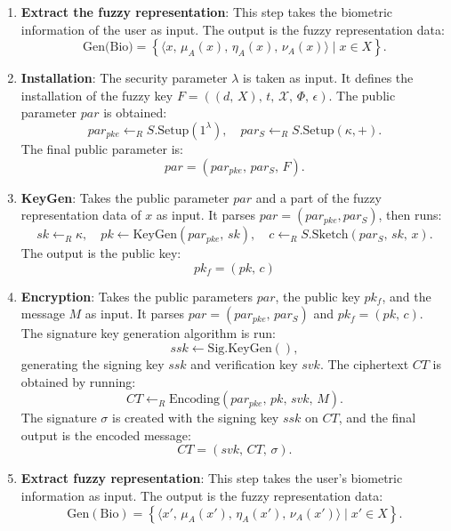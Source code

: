 \documentclass[graybox]{svmult}
\begin{document}
\begin{enumerate}
    \item \textbf{Extract the fuzzy representation}: This step takes the biometric information of the user as input. The output is the fuzzy representation data:
          \[
              \text{Gen(Bio)} = \left\{ \langle x,\, \mu_A(x),\, \eta_A(x),\, \nu_A(x) \rangle \mid x \in X \right\}.
          \]

    \item \textbf{Installation}: The security parameter \( \lambda \) is taken as input. It defines the \break installation of the fuzzy key \( F = ((d,\, X),\, t,\, \mathcal{X},\, \varPhi,\, \epsilon) \). The public parameter \(  par \) is obtained:
          \[
              par_{pke} \leftarrow_R S.\text{Setup}(1^\lambda), \quad par_S \leftarrow_R S.\text{Setup}(\kappa, +).
          \]
          The final public parameter is:
          \[
              par  = (par_{pke},\, par_S,\, F).
          \]

    \item \textbf{KeyGen}: Takes the public parameter \(  par \) and a part of the fuzzy representation data of \( x \) as input. It parses \( par  = (par_{pke}, par_S) \), then runs:
          \[
              sk \leftarrow_R \kappa, \quad pk \leftarrow \text{KeyGen}(par_{pke}, \, sk), \quad c \leftarrow_R S.\text{Sketch}(par_S, \, sk, \, x).
          \]
          The output is the public key:
          \[
              pk_f = (pk,\, c)
          \]

    \item \textbf{Encryption}: Takes the public parameters \(  par \), the public key \( pk_f \), and the message \( M \) as input. It parses \( par  = ( par_{pke}, \, par_S) \) and \( pk_f = (pk, \, c) \). The signature key generation algorithm is run:
          \[
              ssk \leftarrow \text{Sig.KeyGen}(),
          \]
          generating the signing key $ssk$ and verification key $svk$. The ciphertext $CT$ is obtained by running:
          \[
              CT \leftarrow_R \text{Encoding}(par_{pke}, \, pk, \, svk, \, M).
          \]
          The signature $\sigma$ is created with the signing key $ssk$ on $CT$, and the final output is the encoded message:
          \[
              CT = (svk, \, CT, \, \sigma).
          \]

    \item \textbf{Extract fuzzy representation}: This step takes the user's biometric information as input. The output is the fuzzy representation data:
          \[
              \text{Gen}(\text{Bio}) = \left\{ \langle x', \, \mu_A(x'), \, \eta_A(x'), \, \nu_A(x') \rangle \mid x' \in X \right\}.
          \]


\end{enumerate}
\end{document}
